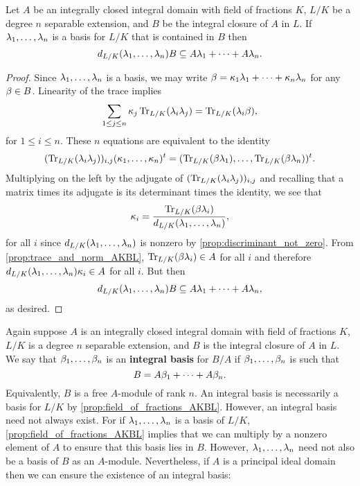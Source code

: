     \begin{lemma}\label{lem:lemma_for_integral_basis_AKBL}
      Let $A$ be an integrally closed integral domain with field of fractions $K$, $L/K$ be a degree $n$ separable extension, and $B$ be the integral closure of $A$ in $L$. If $\lambda_{1},\ldots,\lambda_{n}$ is a basis for $L/K$ that is contained in $B$ then
      \[
        d_{L/K}(\lambda_{1},\ldots,\lambda_{n})B \subseteq A\lambda_{1}+\cdots+A\lambda_{n}.
      \]
    \end{lemma}
    \begin{proof}
      Since $\lambda_{1},\ldots,\lambda_{n}$ is a basis, we may write $\beta = \kappa_{1}\lambda_{1}+\cdots+\kappa_{n}\lambda_{n}$ for any $\beta \in B$. Linearity of the trace implies
      \[
        \sum_{1 \le j \le n}\kappa_{j}\operatorname{\mathrm{Tr}}_{L/K}(\lambda_{i}\lambda_{j}) = \operatorname{\mathrm{Tr}}_{L/K}(\lambda_{i}\beta),
      \]
      for $1 \le i \le n$. These $n$ equations are equivalent to the identity
      \[
        (\operatorname{\mathrm{Tr}}_{L/K}(\lambda_{i}\lambda_{j}))_{i,j}(\kappa_{1},\ldots,\kappa_{n})^{t} = (\operatorname{\mathrm{Tr}}_{L/K}(\beta\lambda_{1}),\ldots,\operatorname{\mathrm{Tr}}_{L/K}(\beta\lambda_{n}))^{t}.
      \]
      Multiplying on the left by the adjugate of $(\operatorname{\mathrm{Tr}}_{L/K}(\lambda_{i}\lambda_{j}))_{i,j}$ and recalling that a matrix times its adjugate is its determinant times the identity, we see that
      \[
        \kappa_{i} = \frac{\operatorname{\mathrm{Tr}}_{L/K}(\beta\lambda_{i})}{d_{L/K}(\lambda_{1},\ldots,\lambda_{n})},
      \]
      for all $i$ since $d_{L/K}(\lambda_{1},\ldots,\lambda_{n})$ is nonzero by \cref{prop:discriminant_not_zero}. From \cref{prop:trace_and_norm_AKBL}, $\operatorname{\mathrm{Tr}}_{L/K}(\beta\lambda_{i}) \in A$ for all $i$ and therefore $d_{L/K}(\lambda_{1},\ldots,\lambda_{n})\kappa_{i} \in A$ for all $i$. But then
      \[
        d_{L/K}(\lambda_{1},\ldots,\lambda_{n})B \subseteq A\lambda_{1}+\cdots+A\lambda_{n},
      \]
      as desired.
    \end{proof}

    Again suppose $A$ is an integrally closed integral domain with field of fractions $K$, $L/K$ is a degree $n$ separable extension, and $B$ is the integral closure of $A$ in $L$. We say that $\beta_{1},\ldots,\beta_{n}$ is an \textbf{integral basis} for $B/A$ if $\beta_{1},\ldots,\beta_{n}$ is such that
    \[
      B = A\beta_{1}+\cdots+A\beta_{n}.
    \]
    Equivalently, $B$ is a free $A$-module of rank $n$. An integral basis is necessarily a basis for $L/K$ by \cref{prop:field_of_fractions_AKBL}. However, an integral basis need not always exist. For if $\lambda_{1},\ldots,\lambda_{n}$ is a basis of $L/K$, \cref{prop:field_of_fractions_AKBL} implies that we can multiply by a nonzero element of $A$ to ensure that this basis lies in $B$. However, $\lambda_{1},\ldots,\lambda_{n}$ need not also be a basis of $B$ as an $A$-module. Nevertheless, if $A$ is a principal ideal domain then we can ensure the existence of an integral basis:
    
